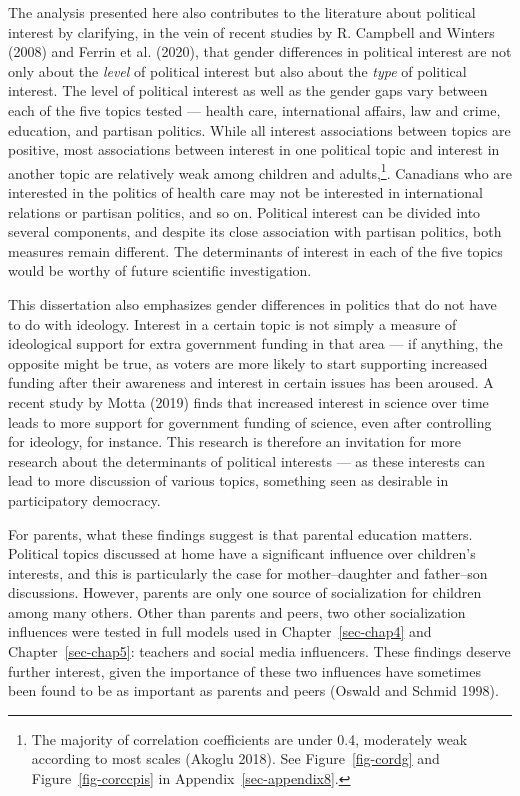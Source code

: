 \documentclass[
  letterpaper,
  DIV=11,
  numbers=noendperiod]{scrreprt}
\begin{document}
The analysis presented here also contributes to the literature about
political interest by clarifying, in the vein of recent studies by R.
Campbell and Winters (2008) and Ferrin et al. (2020), that gender
differences in political interest are not only about the \emph{level} of
political interest but also about the \emph{type} of political interest.
The level of political interest as well as the gender gaps vary between
each of the five topics tested --- health care, international affairs,
law and crime, education, and partisan politics. While all interest
associations between topics are positive, most associations between
interest in one political topic and interest in another topic are
relatively weak among children and adults,\footnote{The majority of
  correlation coefficients are under 0.4, moderately weak according to
  most scales (Akoglu 2018). See Figure~\ref{fig-cordg} and
  Figure~\ref{fig-corccpis} in Appendix~\ref{sec-appendix8}.}. Canadians
who are interested in the politics of health care may not be interested
in international relations or partisan politics, and so on. Political
interest can be divided into several components, and despite its close
association with partisan politics, both measures remain different. The
determinants of interest in each of the five topics would be worthy of
future scientific investigation.

This dissertation also emphasizes gender differences in politics that do
not have to do with ideology. Interest in a certain topic is not simply
a measure of ideological support for extra government funding in that
area --- if anything, the opposite might be true, as voters are more
likely to start supporting increased funding after their awareness and
interest in certain issues has been aroused. A recent study by Motta
(2019) finds that increased interest in science over time leads to more
support for government funding of science, even after controlling for
ideology, for instance. This research is therefore an invitation for
more research about the determinants of political interests --- as these
interests can lead to more discussion of various topics, something seen
as desirable in participatory democracy.

For parents, what these findings suggest is that parental education
matters. Political topics discussed at home have a significant influence
over children's interests, and this is particularly the case for
mother--daughter and father--son discussions. However, parents are only
one source of socialization for children among many others. Other than
parents and peers, two other socialization influences were tested in
full models used in Chapter~\ref{sec-chap4} and Chapter~\ref{sec-chap5}:
teachers and social media influencers. These findings deserve further
interest, given the importance of these two influences have sometimes
been found to be as important as parents and peers (Oswald and Schmid
1998).
\end{document}
